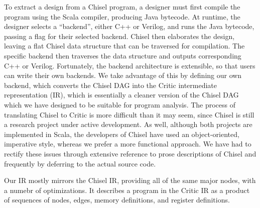 \documentclass[10pt,conference]{IEEEtran}
\begin{document}
To extract a design from a Chisel program, a designer must first compile the program
using the Scala compiler, producing Java bytecode. At runtime, the designer selects
a ``backend'', either C++ or Verilog, and runs the Java bytecode, passing a flag for
their selected backend. Chisel then elaborates the design, leaving a
flat Chisel data structure that can be traversed for compilation. The specific backend
then traverses the data structure and outputs corresponding C++ or Verilog.
Fortunately, the backend architecture is extensible, so that users can write their
own backends. We take advantage of this by defining our own backend, which converts
the Chisel DAG into the Critic intermediate representation (IR), which is essentially
a cleaner version of the Chisel DAG which we have designed to be suitable for program
analysis. The process of translating Chisel to Critic is more difficult than it may seem,
since Chisel is still a research project under active development. As well, although both
projects are implemented in Scala, the developers of Chisel have used an object-oriented,
imperative style, whereas we prefer a more functional approach. We have had to rectify these
issues through extensive reference to prose descriptions of Chisel and frequently by deferring to the actual
source code. 

Our IR mostly mirrors the Chisel IR, providing all of the same major nodes, with a numebr of optimizations.
It describes a program in the Critic IR as a product of sequences of nodes, edges, memory definitions,
and register definitions. 
\end{document}
